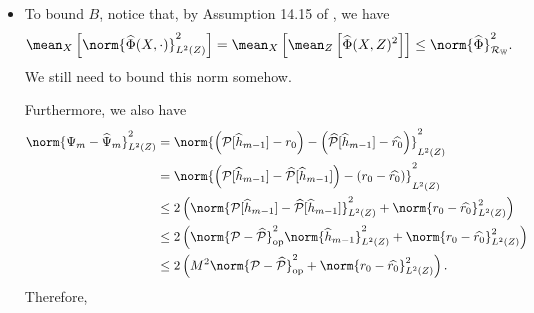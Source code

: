 \begin{itemize}
    \item To bound $ B $, notice that, by Assumption 14.15 of \cite{sugiyama2012}, we have
        \begin{equation*}
            \mean_{ X } \left[
                \norm{ \hat{ \Phi } ( X, \cdot ) }_{ L^{ 2 } ( Z ) }^2
            \right]
            = \mean_{ X } \left[
                \mean_{ Z } \left[
                    \hat{ \Phi } ( X, Z )^2
                \right]
            \right]
            \leq \norm{ \hat{ \Phi } }_{ \mathcal{R}_{ \mathbb{W} } }^2
        .\end{equation*}
        {\color{red} We still need to bound this norm somehow.}

        Furthermore, we also have
        \begin{align*}
            \norm{ \Psi_{ m } - \hat{ \Psi }_{ m } }_{ L^{ 2 } ( Z ) }^2
            &= \norm{
                \left(
                    \meanop [ \hat{ h }_{ m-1 } ] - r_{ 0 }
                \right)
                - \left(
                    \hat{ \meanop } [ \hat{ h }_{ m-1 } ] - \hat{ r_{ 0 } }
                \right)
            }_{ L^{ 2 } ( Z ) }^2 \\
            &= \norm{
                \left(
                    \meanop [ \hat{ h }_{ m-1 } ]
                    - \hat{ \meanop } [ \hat{ h }_{ m-1 } ]
                \right)
                - \left(
                    r_{ 0 } - \hat{ r_{ 0 } }
                \right)
            }_{ L^{ 2 } ( Z ) }^2 \\
            &\leq 2 \left(
                \norm{
                    \meanop [ \hat{ h }_{ m-1 } ]
                    - \hat{ \meanop } [ \hat{ h }_{ m-1 } ]
                }_{ L^{ 2 } ( Z ) }^2
                + \norm{
                    r_{ 0 } - \hat{ r_{ 0 } }
                }_{ L^{ 2 } ( Z ) }^2
            \right) \\
            &\leq 2 \left(
                \norm{ \meanop - \hat{ \meanop } }_{ \mathrm{op} }^2
                \norm{
                    \hat{ h }_{ m-1 }
                }_{ L^{ 2 } ( Z ) }^2
                + \norm{
                    r_{ 0 } - \hat{ r_{ 0 } }
                }_{ L^{ 2 } ( Z ) }^2
            \right) \\
            &\leq 2 \left(
                M^2 \norm{ \meanop - \hat{ \meanop } }_{ \mathrm{op} }^2
                + \norm{
                    r_{ 0 } - \hat{ r_{ 0 } }
                }_{ L^{ 2 } ( Z ) }^2
            \right)
        .\end{align*}
        Therefore,

\end{itemize}
